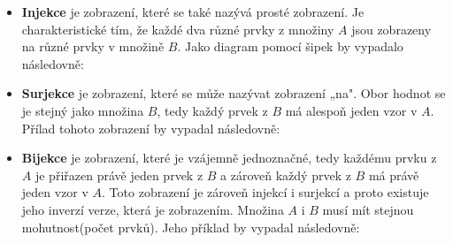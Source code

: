 \documentclass[12pt]{article}
\begin{document}
\begin{itemize}[itemsep = 2pt]
    \item \textbf{Injekce} je zobrazení, které se také nazývá prosté zobrazení. Je charakteristické tím, že každé dva různé prvky z množiny $A$ jsou zobrazeny na různé prvky v množině $B$. Jako diagram pomocí šipek by vypadalo následovně: \\
    
    \item \textbf{Surjekce} je zobrazení, které se může nazývat zobrazení „na". Obor hodnot se je stejný jako množina $B$, tedy každý prvek z $B$ má alespoň jeden vzor v $A$. Přílad tohoto zobrazení by vypadal následovně:\\
    \item \textbf{Bijekce} je zobrazení, které je vzájemně jednoznačné, tedy každému prvku z $A$ je přiřazen právě jeden prvek z $B$ a zároveň každý prvek z $B$ má právě jeden vzor v $A$. Toto zobrazení je zároveň injekcí i surjekcí a proto existuje jeho inverzí verze, která je zobrazením. Množina $A$ i $B$ musí mít stejnou mohutnost(počet prvků). Jeho příklad by vypadal následovně:\\
\end{itemize}
\end{document}
